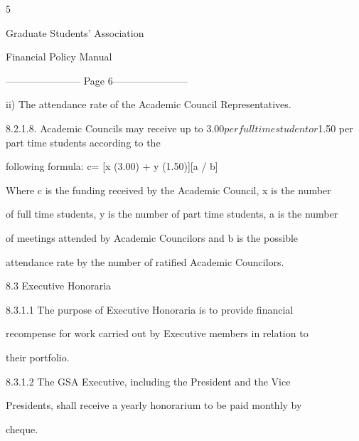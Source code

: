                                                       5  

                                 

                                 

                                Graduate Students’ Association  

                                    Financial Policy Manual  

  


----------------------- Page 6-----------------------

    ii)      The attendance rate of the Academic Council Representatives.  



    8.2.1.8.     Academic  Councils  may  receive  up  to  $3.00  per  full  time  

                 student   or   $1.50   per   part   time   students   according   to   the  

                 following formula: c= [x  (3.00) + y  (1.50)][a / b]   



Where  c is the funding received by the Academic Council, x  is the number  

of full time students, y  is the number of part time students, a  is the number  

of   meetings   attended   by   Academic   Councilors   and   b   is   the   possible  

attendance rate by the number of ratified Academic Councilors.  



  



                             8.3     Executive Honoraria   



    8.3.1.1      The  purpose  of  Executive  Honoraria  is  to  provide  financial  

         recompense for work carried out by Executive members in relation to  

         their portfolio.   



    8.3.1.2      The  GSA  Executive,  including  the  President  and  the  Vice  

         Presidents, shall receive a  yearly honorarium  to  be paid  monthly  by  

         cheque.   



